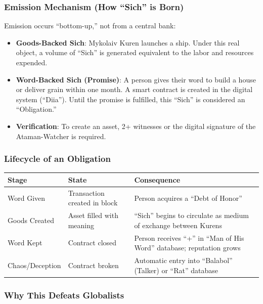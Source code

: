 \documentclass[11pt,a4paper]{article}
\theoremstyle{definition}
\theoremstyle{remark}
\begin{document}
\subsubsection{Emission Mechanism (How ``Sich'' is Born)}

Emission occurs ``bottom-up,'' not from a central bank:

\begin{itemize}
\item \textbf{Goods-Backed Sich}: Mykolaiv Kuren launches a ship. Under this real object, a volume of ``Sich'' is generated equivalent to the labor and resources expended.

\item \textbf{Word-Backed Sich (Promise)}: A person gives their word to build a house or deliver grain within one month. A smart contract is created in the digital system (``Diia''). Until the promise is fulfilled, this ``Sich'' is considered an ``Obligation.''

\item \textbf{Verification}: To create an asset, 2+ witnesses or the digital signature of the Ataman-Watcher is required.
\end{itemize}

\subsubsection{Lifecycle of an Obligation}

\begin{center}
\begin{tabular}{|l|l|p{6cm}|}
\hline
\textbf{Stage} & \textbf{State} & \textbf{Consequence} \\ \hline
Word Given & Transaction created in block & Person acquires a ``Debt of Honor'' \\
Goods Created & Asset filled with meaning & ``Sich'' begins to circulate as medium of exchange between Kurens \\
Word Kept & Contract closed & Person receives ``+'' in ``Man of His Word'' database; reputation grows \\
Chaos/Deception & Contract broken & Automatic entry into ``Balabol'' (Talker) or ``Rat'' database \\ \hline
\end{tabular}
\end{center}

\subsubsection{Why This Defeats Globalists}
\end{document}
